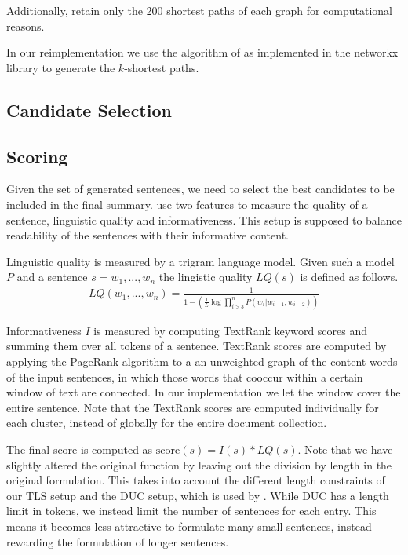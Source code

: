 \documentclass[a4paper,BCOR=10mm]{report}
\begin{document}
Additionally, \citet{banerjee} retain only the 200 shortest paths of each graph for computational reasons.

In our reimplementation we use the algorithm of \citet{kshortestpath} as implemented in the networkx library \citep{networkx} to generate the $k$-shortest paths.

\subsection{Candidate Selection}

\subsection{Scoring}

Given the set of generated sentences, we need to select the best candidates to be included in the final summary. \citet{banerjee} use two features to measure the quality of a sentence, linguistic quality and informativeness. This setup is supposed to balance readability of the sentences with their informative content.

Linguistic quality is measured by a trigram language model. Given such a model $P$ and a sentence $s = w_1, ..., w_n$ the lingistic quality $LQ(s)$ is defined as follows.
\begin{align*}
LQ(w_1, ..., w_n) = \frac{1}{1 - (\frac{1}{L} \log \prod_{i > 3}^{n} P(w_i | w_{i - 1}, w_{i - 2}))}
\end{align*}

Informativeness $I$ is measured by computing TextRank \citet{textrank} keyword scores and summing them over all tokens of a sentence.
TextRank scores are computed by applying the PageRank \citet{pagerank} algorithm to a an unweighted graph of the content words of the input sentences, in which those words that cooccur within a certain window of text are connected.
In our implementation we let the window cover the entire sentence.
Note that the TextRank scores are computed individually for each cluster, instead of globally for the entire document collection.

The final score is computed as $\text{score}(s) = I(s) * LQ(s)$. Note that we have slightly altered the original function by leaving out the division by length in the original formulation. This takes into account the different length constraints of our TLS setup and the DUC setup, which is used by \citeauthor{banerjee}. While DUC has a length limit in tokens, we instead limit the number of sentences for each entry.
This means it becomes less attractive to formulate many small sentences, instead rewarding the formulation of longer sentences.
\end{document}
